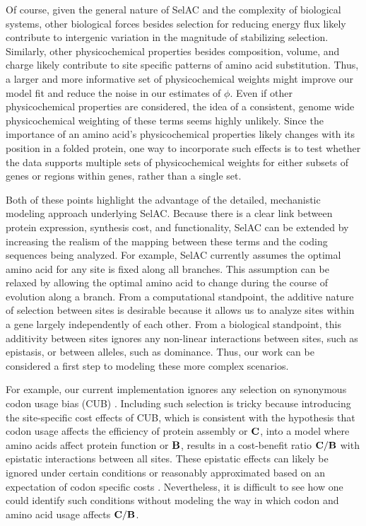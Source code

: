 \documentclass[12pt,letterpaper,fleqn]{article}
\newcommand{\PC}{physicochemical\xspace}
\newcommand{\Cost}{\ensuremath{\text{\textbf{C}}}\xspace}
\newcommand{\Func}{\ensuremath{\text{\textbf{B}}}\xspace}
\newcommand{\selac}{SelAC\xspace}
\begin{document}
Of course, given the general nature of \selac and the complexity of biological systems, other biological forces besides selection for reducing energy flux likely contribute to intergenic variation in the magnitude of stabilizing selection.
Similarly, other physicochemical properties besides composition, volume, and charge likely contribute to site specific patterns of amino acid substitution.
Thus, a larger and more informative set of \PC weights might improve our model fit and reduce the noise in our estimates of $\phi$.
Even if other physicochemical properties are considered, the idea of a consistent, genome wide \PC weighting of these terms seems highly unlikely.
Since the importance of an amino acid's physicochemical properties likely changes with its position in a folded protein, one way to incorporate such effects is to test whether the data supports multiple sets of \PC weights for either subsets of genes or regions within genes, rather than a single set.

Both of these points highlight the advantage of the detailed, mechanistic modeling approach underlying \selac.
Because there is a clear link between protein expression, synthesis cost, and functionality, \selac can be extended by increasing the realism of the mapping between these terms and the coding sequences being analyzed.
For example, \selac currently assumes the optimal amino acid for any site is fixed along all branches.
This assumption can be relaxed by allowing the optimal amino acid to change during the course of evolution along a branch.
From a computational standpoint, the additive nature of selection between sites is desirable because it allows us to analyze sites within a gene largely independently of each other.
From a biological standpoint, this additivity between sites ignores any non-linear interactions between sites, such as epistasis, or between alleles, such as dominance.
Thus, our work can be considered a first step to modeling these more complex scenarios.

For example, our current implementation ignores any selection on synonymous codon usage bias (CUB) \citep[c.f.~][]{YangAndNielsen2008,PouyetEtAl2016}.
Including such selection is tricky because introducing the site-specific cost effects of CUB, which is consistent with the hypothesis that codon usage affects the efficiency of protein assembly or \Cost, into a model where amino acids affect protein function or \Func, results in a cost-benefit ratio $\Cost/\Func$ with epistatic interactions between all sites.
These epistatic effects can likely be ignored under certain conditions or reasonably approximated based on an expectation of codon specific costs \citep[e.g.~][]{KubatkoEtAl2016}.
Nevertheless, it is difficult to see how one could identify such conditions without modeling the way in which codon and amino acid usage affects $\Cost/\Func$.
\end{document}
